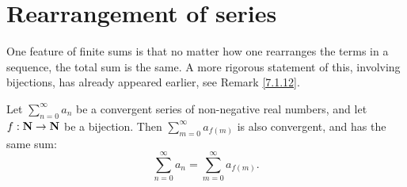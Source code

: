 \section{Rearrangement of series}\label{sec 7.4}

\begin{note}
    One feature of finite sums is that no matter how one rearranges the terms in a sequence, the total sum is the same.
    A more rigorous statement of this, involving bijections, has already appeared earlier, see Remark \ref{7.1.12}.
\end{note}

\begin{proposition}\label{7.4.1}
    Let \(\sum_{n = 0}^\infty a_n\) be a convergent series of non-negative real numbers, and let \(f : \mathbf{N} \to \mathbf{N}\) be a bijection.
    Then \(\sum_{m = 0}^\infty a_{f(m)}\) is also convergent, and has the same sum:
    \[
        \sum_{n = 0}^\infty a_n = \sum_{m = 0}^\infty a_{f(m)}.
    \]
\end{proposition}

